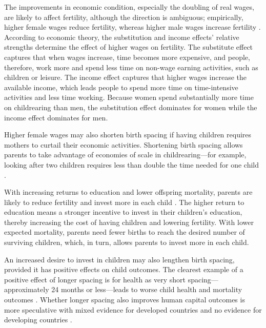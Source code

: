 \documentclass[12pt,letterpaper]{article}
\begin{document}
The improvements in economic condition, especially the doubling of real wages,
are likely to affect fertility, although the direction is ambiguous; empirically, 
higher female wages reduce fertility, whereas higher male wages increase fertility 
\citep{Hotz1997,schultz97}.
According to economic theory, the substitution and income effects' relative strengths 
determine the effect of higher wages on fertility.
The substitute effect captures that when wages increase, time becomes more expensive, and
people, therefore, work more and spend less time on non-wage earning activities, such as
children or leisure.
The income effect captures that higher wages increase the available income, which
leads people to spend more time on time-intensive activities and less time working.
Because women spend substantially more time on childrearing than men, the substitution
effect dominates for women while the income effect dominates for men.

Higher female wages may also shorten birth spacing if having children requires mothers to
curtail their economic activities.
Shortening birth spacing allows parents to take advantage of economies of scale in 
childrearing---for example, looking after two children requires less than double the time 
needed for one child \citep{Vijverberg1982,Hotz1997}.

With increasing returns to education and lower offspring mortality, parents are likely to 
reduce fertility and invest more in each child \citep{Rosenzweig1982a,Wolpin1997}.
The higher return to education means a stronger incentive to invest in their children's
education, thereby increasing the cost of having children and lowering fertility. 
With lower expected mortality, parents need fewer births to reach the desired number of
surviving children, which, in turn, allows parents to invest more in each child.

An increased desire to invest in children may also lengthen birth spacing, provided it has 
positive effects on child outcomes. 
The clearest example of a positive effect of longer spacing is for health as very short 
spacing---approximately 24 months or less---leads to worse child health and mortality 
outcomes \citep{Whitworth2002,Conde-Agudelo2012}.
Whether longer spacing also improves human capital outcomes is more speculative with
mixed evidence for developed countries and no evidence for developing countries
\citep{Zajonc1976,Powell1993,Pettersson-Lidbom2009,Buckles2012,Barclay2017}.
\end{document}
